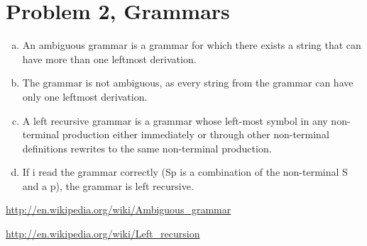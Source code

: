 \documentclass[titlepage]{article}
\begin{document}
\section{Problem 2, Grammars}
\begin{enumerate}[a)]
\item
An ambiguous grammar is a grammar for which there exists a string that can have more than one leftmost derivation.\cite{wikiambi}

\item
The grammar is not ambiguous, as every string from the grammar can have only one leftmost derivation.

\item
A left recursive grammar is a grammar whose left-most symbol in any non-terminal production either immediately or through other non-terminal definitions rewrites to the same non-terminal production.\cite{wikilr}

\item
If i read the grammar correctly (Sp is a combination of the non-terminal S and a p), the grammar is left recursive.
\end{enumerate}
\begin{thebibliography}{9}

  \url{http://en.wikipedia.org/wiki/Ambiguous_grammar}

  \url{http://en.wikipedia.org/wiki/Left_recursion}

\end{thebibliography}
\end{document}
